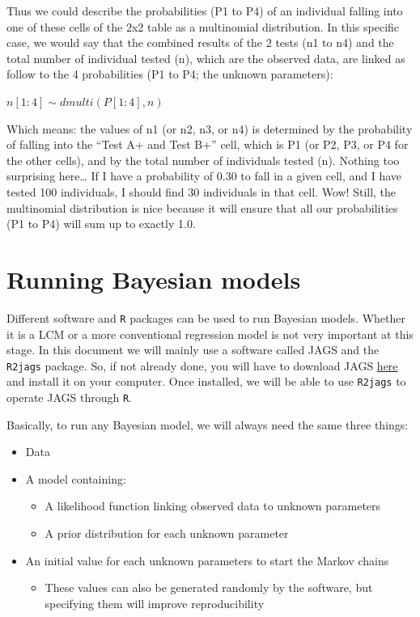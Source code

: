 \documentclass[
]{book}
\providecommand{\tightlist}{%
  \setlength{\itemsep}{0pt}\setlength{\parskip}{0pt}}
\begin{document}
Thus we could describe the probabilities (P1 to P4) of an individual
falling into one of these cells of the 2x2 table as a multinomial
distribution. In this specific case, we would say that the combined
results of the 2 tests (n1 to n4) and the total number of individual
tested (n), which are the observed data, are linked as follow to the 4
probabilities (P1 to P4; the unknown parameters):

\(n[1:4] \sim dmulti(P[1:4], n)\)

Which means: the values of n1 (or n2, n3, or n4) is determined by the
probability of falling into the ``Test A+ and Test B+'' cell, which is
P1 (or P2, P3, or P4 for the other cells), and by the total number of
individuals tested (n). Nothing too surprising here\ldots{} If I have a
probability of 0.30 to fall in a given cell, and I have tested 100
individuals, I should find 30 individuals in that cell. Wow! Still, the
multinomial distribution is nice because it will ensure that all our
probabilities (P1 to P4) will sum up to exactly 1.0.

\hypertarget{running-bayesian-models}{%
\chapter{Running Bayesian models}\label{running-bayesian-models}}

Different software and \texttt{R} packages can be used to run Bayesian
models. Whether it is a LCM or a more conventional regression model is
not very important at this stage. In this document we will mainly use a
software called JAGS and the \texttt{R2jags} package. So, if not already
done, you will have to download JAGS
\href{https://sourceforge.net/projects/mcmc-jags/files/}{here} and
install it on your computer. Once installed, we will be able to use
\texttt{R2jags} to operate JAGS through \texttt{R}.

Basically, to run any Bayesian model, we will always need the same three
things:

\begin{itemize}
\tightlist
\item
  Data
\item
  A model containing:

  \begin{itemize}
  \tightlist
  \item
    A likelihood function linking observed data to unknown parameters
  \item
    A prior distribution for each unknown parameter
  \end{itemize}
\item
  An initial value for each unknown parameters to start the Markov
  chains

  \begin{itemize}
  \tightlist
  \item
    These values can also be generated randomly by the software, but
    specifying them will improve reproducibility
  \end{itemize}
\end{itemize}
\end{document}
